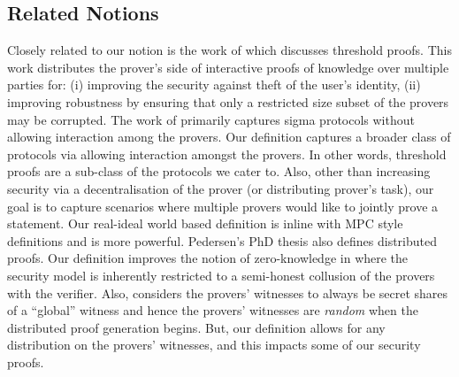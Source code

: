 \subsection{Related Notions}
Closely related to our notion is the work of \cite{EfficientTZ} which discusses threshold proofs. This work distributes the prover's side of interactive proofs of knowledge over multiple parties for: (i) improving the security against theft of the user's identity, (ii) improving robustness by ensuring that only a restricted size subset of the provers may be corrupted. The work of \cite{EfficientTZ} primarily captures sigma protocols without allowing interaction among the provers. Our definition captures a broader class of protocols via allowing interaction amongst the provers.  In other words, threshold proofs are a sub-class of the protocols we cater to. Also, other than increasing security via a decentralisation of the prover (or distributing prover's task), our goal is to capture scenarios where multiple provers would like to jointly prove a statement.  Our real-ideal world based definition is inline with MPC style definitions and is more powerful. Pedersen's PhD thesis \cite{Ped92} also defines distributed proofs. Our definition improves the notion of zero-knowledge in \cite{Ped92} where the security model is inherently restricted to a semi-honest collusion of the provers with the verifier. Also, \cite{Ped92} considers the provers' witnesses to always be secret shares of a ``global'' witness and hence the provers' witnesses are \textit{random} when the distributed proof generation begins. But, our definition allows for any distribution on the provers' witnesses, and this impacts some of our security proofs.



